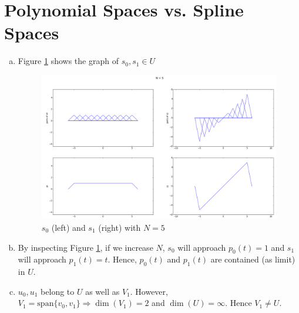 \section{Polynomial Spaces vs. Spline Spaces}\label{sec:p4}

\begin{enumerate}[(a)]
\item Figure \ref{fig:p4a} shows the graph of $s_0, s_1 \in U$
\begin{figure}[htbp]
	\centering
	\includegraphics[width=\linewidth]{images/p4a}
	\caption{$s_0$ (left) and $s_1$ (right) with $N=5$}
	\label{fig:p4a}
\end{figure}

\item By inspecting Figure \ref{fig:p4a}, if we increase $N$, $s_0$ will approach $p_0(t) = 1$ and $s_1$ will approach $p_1(t) = t$. Hence, $p_0(t)$ and $p_1(t)$ are contained (as limit) in $U$.

\item $u_0, u_1$ belong to $U$  as well as $V_1$. However, $V_1 = \mathrm{span}\{v_0, v_1\} \Rightarrow \dim(V_1) = 2$ and $\dim(U) = \infty$. Hence $V_1 \neq U$.
\end{enumerate}